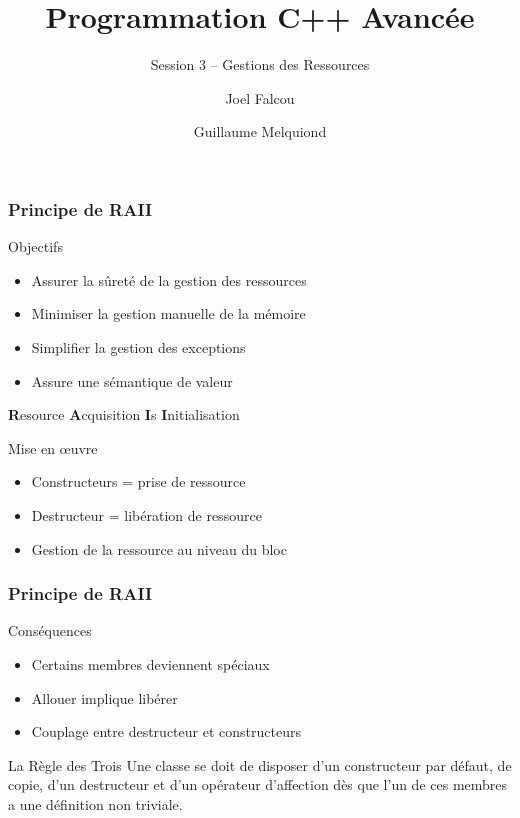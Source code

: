 \documentclass[svgnames]{beamer}
\title{Programmation C++ Avancée}
\subtitle{Session 3 -- Gestions des Ressources}
\author{Joel Falcou \and Guillaume Melquiond}
\institute{Laboratoire de Recherche en Informatique}
\date{}
\begin{document}


\begin{frame}[plain]
\titlepage
\end{frame}
\setcounter{framenumber}{0}

\frame
{
  \frametitle{Principe de RAII}
  \begin{block}{Objectifs}
  \begin{itemize}\footnotesize
  \item Assurer la sûreté de la gestion des ressources
  \item Minimiser la gestion manuelle de la mémoire
  \item Simplifier la gestion des exceptions
  \item Assure une sémantique de valeur
  \end{itemize}
  \end{block}
  
  \begin{center}
  \textbf{R}esource \textbf{A}cquisition \textbf{I}s \textbf{I}nitialisation
  \end{center}

  \begin{block}{Mise en \oe{uvre}}
  \begin{itemize}\footnotesize
  \item Constructeurs = prise de ressource
  \item Destructeur = libération de ressource
  \item Gestion de la ressource au niveau du bloc
  \end{itemize}
  \end{block}
}

\frame
{
  \frametitle{Principe de RAII}
  \begin{block}{Conséquences}
  \begin{itemize}
  \item Certains membres deviennent spéciaux
  \item Allouer implique libérer
  \item Couplage entre destructeur et constructeurs
  \end{itemize}
  \end{block}

  \begin{block}{La Règle des Trois}
  Une classe se doit de disposer d'un constructeur par défaut, de copie,
  d'un destructeur et d'un opérateur d'affection dès que l'un de ces membres
  a une définition non triviale.
  \end{block}
}
\end{document}
